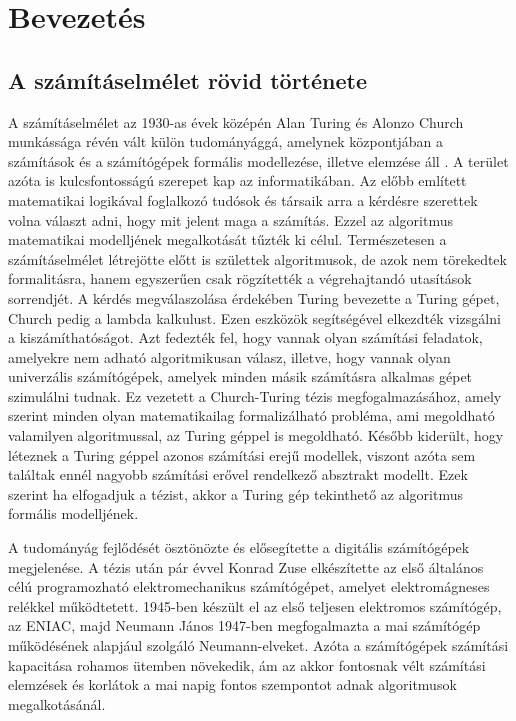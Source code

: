 \chapter{Bevezetés}
\label{ch:intro}

\section{A számításelmélet rövid története}
A számításelmélet az 1930-as évek középén Alan Turing és Alonzo Church munkássága révén vált külön tudományággá, amelynek központjában a számítások és a számítógépek formális modellezése, illetve elemzése áll \cite{savage2008modelsofcomp}. A terület azóta is kulcsfontosságú szerepet kap az informatikában. Az előbb említett matematikai logikával foglalkozó tudósok és társaik arra a kérdésre szerettek volna választ adni, hogy mit jelent maga a számítás. Ezzel az algoritmus matematikai modelljének megalkotását tűzték ki célul. Természetesen a számításelmélet létrejötte előtt is születtek algoritmusok, de azok nem törekedtek formalitásra, hanem egyszerűen csak rögzítették a végrehajtandó utasítások sorrendjét. A kérdés megválaszolása érdekében Turing bevezette a Turing gépet, Church pedig a lambda kalkulust. Ezen eszközök segítségével elkezdték vizsgálni a kiszámíthatóságot. Azt fedezték fel, hogy vannak olyan számítási feladatok, amelyekre nem adható algoritmikusan válasz, illetve, hogy vannak olyan univerzális számítógépek, amelyek minden másik számításra alkalmas gépet szimulálni tudnak.
Ez vezetett a Church-Turing tézis megfogalmazásához, amely szerint minden olyan matematikailag formalizálható probléma, ami megoldható valamilyen algoritmussal, az Turing géppel is megoldható. Később kiderült, hogy léteznek a Turing géppel azonos számítási erejű modellek, viszont azóta sem találtak ennél nagyobb számítási erővel rendelkező absztrakt modellt. Ezek szerint ha elfogadjuk a tézist, akkor a Turing gép tekinthető az algoritmus formális modelljének.

A tudományág fejlődését ösztönözte és elősegítette a digitális számítógépek megjelenése. A tézis után pár évvel Konrad Zuse elkészítette az első általános célú programozható elektromechanikus számítógépet, amelyet elektromágneses relékkel működtetett. 1945-ben készült el az első teljesen elektromos számítógép, az ENIAC, majd Neumann János 1947-ben megfogalmazta a mai számítógép működésének alapjául szolgáló Neumann-elveket. Azóta a számítógépek számítási kapacitása rohamos ütemben növekedik, ám az akkor fontosnak vélt számítási elemzések és korlátok a mai napig fontos szempontot adnak algoritmusok megalkotásánál.


